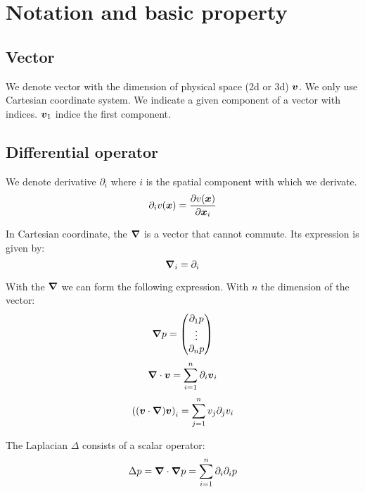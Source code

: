 \chapter{Notation and basic property}
\minitoc


\section{Vector}

We denote vector with the dimension of physical space (2d or 3d) ${\boldsymbol {v}}$.
We only use Cartesian coordinate system.
We indicate a given component of a vector with indices. ${\boldsymbol {v}}_1$ indice the first component.

\section{Differential operator}

We denote derivative  $\partial_i$ where $i$ is the spatial component with which we derivate.
\begin{equation}
 \partial_i v({\boldsymbol {x}})=\frac{\partial v({\boldsymbol {x}})}{\partial {\boldsymbol {x}}_{i}}
\end{equation}

\begin{definition}[Nabla]
 In Cartesian coordinate, the ${\boldsymbol {\nabla}}$ is a vector that cannot commute.
 Its expression is given by:
 \begin{equation}
 {\boldsymbol {\nabla}}_{i}=\partial_{i}
 \end{equation}
\end{definition}

With the ${\boldsymbol {\nabla}}$ we can form the following expression.
With $n$ the dimension of the vector:
\begin{equation}
 {\boldsymbol {\nabla}}p=\begin{pmatrix}\partial_1 p\\ \vdots \\ \partial_n p\end{pmatrix}
\end{equation}
\begin{equation}
 {\boldsymbol {\nabla}}\cdot {\boldsymbol {v}}=\sum_{i=1}^{n}\partial_i {\boldsymbol {v}}_i
\end{equation}
\begin{equation}
 \left(({\boldsymbol {v}}\cdot{\boldsymbol {\nabla}}){\boldsymbol {v}}\right)_{i}=\sum_{j=1}^{n}v_{j}\partial_{j} v_{i}
\end{equation}


\begin{definition}[Laplacian]
The Laplacian $\Delta$ consists of a scalar operator:
\begin{equation}
\Delta p={\boldsymbol {\nabla}}\cdot {\boldsymbol {\nabla}}p=\sum_{i=1}^{n} \partial_{i}\partial_{i}p
\end{equation}
\end{definition}


